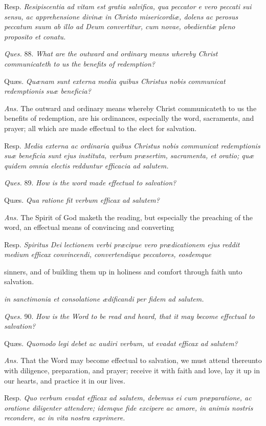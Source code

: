 Resp. \emph{Resipiscentia ad vitam est gratia salvifica, qua peccator e vero peccati sui sensu, ac apprehensione divinæ in Christo misericordiæ, dolens ac perosus peccatum suum ab illo ad Deum convertitur, cum novae, obedientiæ pleno proposito et conatu.}

\emph{Ques.} 88. \emph{What are the outward and ordinary means whereby Christ communicateth to us the benefits of redemption?}

Quæs. \emph{Quænam sunt externa media quibus Christus nobis communicat redemptionis suæ beneficia?}

\emph{Ans.} The outward and ordinary means whereby Christ communicateth to us the benefits of redemption, are his ordinances, especially the word, sacraments, and prayer; all which are made effectual to the elect for salvation.

Resp. \emph{Media externa ac ordinaria quibus Christus nobis communicat redemptionis suæ beneficia sunt ejus instituta, verbum præsertim, sacramenta, et oratio; quæ quidem omnia electis redduntur efficacia ad salutem.}

\emph{Ques.} 89. \emph{How is the word made effectual to salvation?}

Quæs. \emph{Qua ratione fit verbum efficax ad salutem?}

\emph{Ans.} The Spirit of God maketh the reading, but especially the preaching of the word, an effectual means of convincing and converting

Resp. \emph{Spiritus Dei lectionem verbi præcipue vero prædicationem ejus reddit medium efficax convincendi, convertendique peccatores, eosdemque }

sinners, and of building them up in holiness and comfort through faith unto salvation.

\emph{in sanctimonia et consolatione ædificandi per fidem ad salutem.}

\emph{Ques.} 90. \emph{How is the Word to be read and heard, that it may become effectual to salvation?}

Quæs. \emph{Quomodo legi debet ac audiri verbum, ut evadat efficax ad salutem?}

\emph{Ans.} That the Word may become effectual to salvation, we must attend thereunto with diligence, preparation, and prayer; receive it with faith and love, lay it up in our hearts, and practice it in our lives.

Resp. \emph{Quo verbum evadat efficax ad salutem, debemus ei cum præparatione, ac oratione diligenter attendere; idemque fide excipere ac amore, in animis nostris recondere, ac in vita nostra exprimere.}

